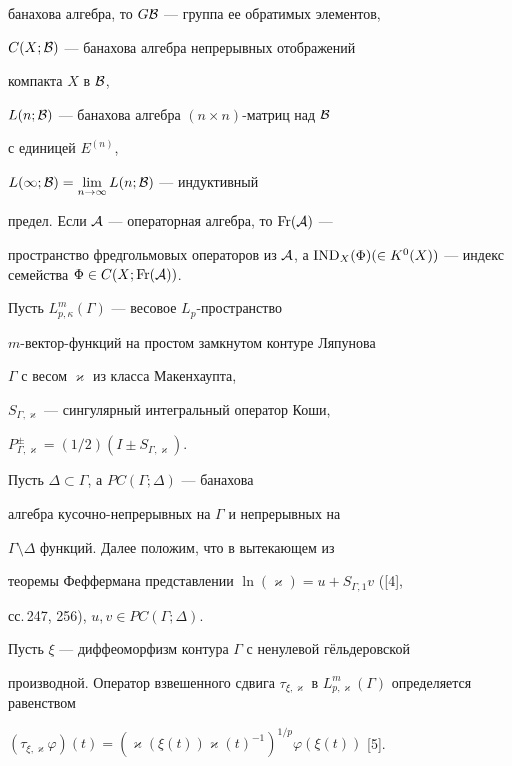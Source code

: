 банахова алгебра, то $G{\cal B}$ --- группа ее обратимых элементов,


$C(X;{\cal B})$ --- банахова алгебра непрерывных отображений


компакта $X$ в ${\cal B}$,


$L(n;{\cal B})$ --- банахова алгебра $(n\times n)$-матриц над ${\cal B}$


с единицей $E^{(n)}$,


$L(\infty;{\cal B})=\lim\limits_{n\to \infty}L(n;{\cal B})$ --- индуктивный


предел. Если ${\cal A}$ --- операторная алгебра, то $\operatorname{Fr}({\cal A})$ ---


пространство фредгольмовых операторов из ${\cal A}$, а $\IND_X(\Phi)(\in


K^0(X))$ --- индекс семейства $\Phi \in C(X;\Fr({\cal A}))$.





Пусть $L_{p,\kappa}^m(\Gamma)$ --- весовое $L_p$-пространство


$m$-вектор-функций на простом замкнутом контуре Ляпунова


$\Gamma$ с весом $\varkappa$ из класса Макенхаупта,


$S_{\Gamma, \varkappa}$ --- сингулярный интегральный оператор Коши,


$P^\pm_{\Gamma, \varkappa}=(1/2)(I\pm S_{\Gamma, \varkappa})$.


Пусть $\Delta\subset\Gamma$, а $PC(\Gamma;\Delta)$ --- банахова


алгебра кусочно-непрерывных на $\Gamma$ и непрерывных на


$\Gamma\setminus\Delta$ функций. Далее положим, что в вытекающем из


теоремы Феффермана представлении $\ln (\varkappa)=u+S_{\Gamma, 1}v$ ([4],


сс.\,247, 256), $u,v\in PC(\Gamma;\Delta)$.





Пусть $\xi$ --- диффеоморфизм контура $\Gamma$ с ненулевой г\"ельдеровской


производной. Оператор взвешенного сдвига $\tau_{\xi,\varkappa}$ в $L^m_{p,


\varkappa}(\Gamma)$ определяется равенством


$(\tau_{\xi,\varkappa}\varphi)(t)=


(\varkappa (\xi (t))\varkappa (t)^{-1})^{1/p}\varphi (\xi (t))$ [5].


